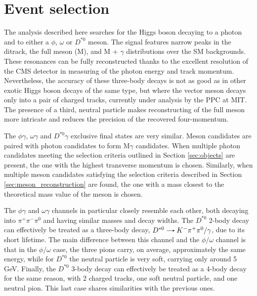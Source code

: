 \section{Event selection}\label{sec:event_selection}

The analysis described here searches for the Higgs boson decaying to a photon and to either a $\phi$, $\omega$ or $D^{*0}$ meson. The signal features narrow peaks in the ditrack, the full meson (M), and M + $\gamma$ distributions over the SM backgrounds. These resonances can be fully reconstructed thanks to the excellent resolution of the CMS detector in measuring of the photon energy and track momentum. Nevertheless, the accuracy of these three-body decays is not as good as in other exotic Higgs boson decays of the same type, but where the vector meson decays only into a pair of charged tracks, currently under analysis by the PPC at MIT. The presence of a third, neutral particle makes reconstructing of the full meson more intricate and reduces the precision of the recovered four-momentum.

The $\phi\gamma$, $\omega\gamma$ and $D^{*0}\gamma$ exclusive final states are very similar. Meson candidates are paired with photon candidates to form M$\gamma$ candidates. When multiple photon candidates meeting the selection criteria outlined in Section \ref{sec:objects} are present, the one with the highest transverse momentum is chosen. Similarly, when multiple meson candidates satisfying the selection criteria described in Section \ref{sec:meson_reconstruction} are found, the one with a mass closest to the theoretical mass value of the meson is chosen.

The $\phi\gamma$ and $\omega\gamma$ channels in particular closely resemble each other, both decaying into $\pi^{+}\pi^{-}\pi^0$ and having similar masses and decay widths. The $D^{*0}$ 2-body decay can effectively be treated as a three-body decay, $D^{*0}\decaysto K^{-}\pi^{+}\pi^0/\gamma$, due to its short lifetime. The main difference between this channel and the $\phi/\omega$ channel is that in the $\phi/\omega$ case, the three pions carry, on average, approximately the same energy, while for $D^{*0}$ the neutral particle is very soft, carrying only around 5 GeV. Finally, the $D^{*0}$ 3-body decay can effectively be treated as a 4-body decay for the same reason, with 2 charged tracks, one soft neutral particle, and one neutral pion. This last case shares similarities with the previous ones.

